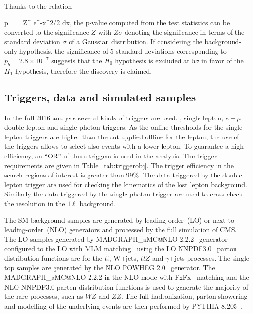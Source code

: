 Thanks to the relation  

{
 p = \int_Z^{\infty}  e^{-x^{2}/2} dx,
}
the p-value computed from the test statistics can be converted to the significance $Z$ with $Z\sigma$ denoting the significance in terms of the standard deviation $\sigma$ of a Gaussian distribution. If considering the background-only hypothesis, the significance of 5 standard deviations corresponding to $p_{b} = 2.8 \times 10^{-7} $ suggests that the $H_{0}$ hypothesis is excluded at $5 \sigma$ in favor of the $H_{1}$ hypothesis, therefore the discovery is claimed. %


\subsection{Triggers, data and simulated samples~\label{sec:trigger}}

In the full 2016 analysis several kinds of triggers are used:  \MET, single lepton, $e-\mu$ double lepton  and single photon triggers. As the online thresholds for the single lepton triggers are higher than the cut applied offline for the lepton, the use of the \MET triggers allows to select also events with a lower \pt lepton. To guarantee a high efficiency,  an ``OR'' of these triggers is used in the analysis. The trigger requirements are given in Table~\ref{tab:triggerobj}. The trigger efficiency in the search regions of interest is greater than 99\%. The data triggered by the double lepton trigger are used for checking the kinematics of the lost lepton background. Similarly the data triggered by the single photon trigger are used to cross-check the \MET resolution in  the $1\ell$ background. 

The SM background samples are generated by leading-order~(LO) or next-to-leading-order~(NLO) generators and processed by the full simulation of CMS. The LO samples generated by MADGRAPH\_aMC@NLO 2.2.2~\cite{Alwall:2014hca} generator configured to the LO with MLM matching~\cite{Alwall:2007fs} using the LO NNPDF3.0~\cite{Ball:2014uwa} parton distribution functions are for the  $t\bar{t}$, W+jets, $t\bar{t}Z$ and $\gamma$+jets processes. The single top samples are generated by the NLO POWHEG 2.0~\cite{Alioli:2010xd} generator. The MADGRAPH\_aMC@NLO 2.2.2 in the NLO mode with FxFx~\cite{Frederix:2012ps} matching and the NLO NNPDF3.0 parton distribution functions is used to generate the majority of the rare processes, such as $WZ$ and $ZZ$. The full hadronization, parton showering and modelling of the underlying events are then performed by PYTHIA 8.205~\cite{Sjostrand:2014zea}.


